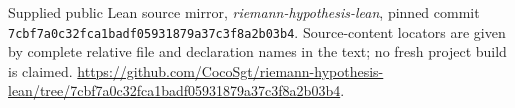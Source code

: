 Supplied public Lean source mirror,
\emph{riemann-hypothesis-lean},
pinned commit
\texttt{7cbf7a0c32fca1badf05931879a37c3f8a2b03b4}.
Source-content locators are given by complete relative file and
declaration names in the text; no fresh project build is claimed.
\url{https://github.com/CocoSgt/riemann-hypothesis-lean/tree/7cbf7a0c32fca1badf05931879a37c3f8a2b03b4}.

